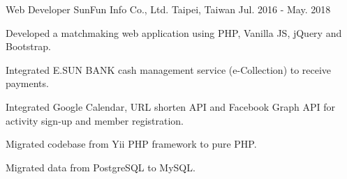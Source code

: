 \begin{cventries}
  \cventry
    {Web Developer} %
    {SunFun Info Co., Ltd.} %
    {Taipei, Taiwan} %
    {Jul. 2016 - May. 2018} %
    {
      \begin{cvitems} %
        \item {Developed a matchmaking web application using PHP, Vanilla JS, jQuery and Bootstrap.}
        \item {Integrated E.SUN BANK cash management service (e-Collection) to receive payments.}
        \item {Integrated Google Calendar, URL shorten API and Facebook Graph API for activity sign-up and member registration.}
        \item {Migrated codebase from Yii PHP framework to pure PHP.}
        \item {Migrated data from PostgreSQL to MySQL.}
      \end{cvitems}
    }

\end{cventries}
